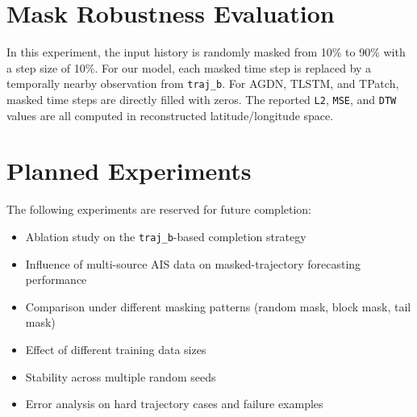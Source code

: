 \documentclass[11pt]{article}
\begin{document}
\section{Mask Robustness Evaluation}

In this experiment, the input history is randomly masked from 10\% to 90\% with a step size of 10\%.
For our model, each masked time step is replaced by a temporally nearby observation from \texttt{traj\_b}.
For AGDN, TLSTM, and TPatch, masked time steps are directly filled with zeros.
The reported \texttt{L2}, \texttt{MSE}, and \texttt{DTW} values are all computed in reconstructed latitude/longitude space.



\section{Planned Experiments}

The following experiments are reserved for future completion:

\begin{itemize}
    \item Ablation study on the \texttt{traj\_b}-based completion strategy
    \item Influence of multi-source AIS data on masked-trajectory forecasting performance
    \item Comparison under different masking patterns (random mask, block mask, tail mask)
    \item Effect of different training data sizes
    \item Stability across multiple random seeds
    \item Error analysis on hard trajectory cases and failure examples
\end{itemize}
\end{document}
